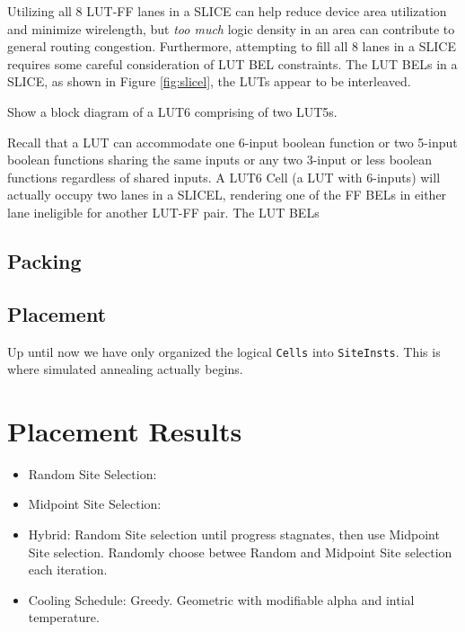 \documentclass{article}
\begin{document}
\begin{multicols}{2}
        Utilizing all 8 LUT-FF lanes in a SLICE can help reduce device area utilization and minimize wirelength, but \emph{too much} logic density in an area can contribute to general routing congestion. 
        Furthermore, attempting to fill all 8 lanes in a SLICE requires some careful consideration of LUT BEL constraints. 
        The LUT BELs in a SLICE, as shown in Figure \ref{fig:slicel}, the LUTs appear to be interleaved. 


        Show a block diagram of a LUT6 comprising of two LUT5s.


        Recall that a LUT can accommodate one 6-input boolean function or two 5-input boolean functions sharing the same inputs or any two 3-input or less boolean functions regardless of shared inputs. 
        A LUT6 Cell (a LUT with 6-inputs) will actually occupy two lanes in a SLICEL, rendering one of the FF BELs in either lane ineligible for another LUT-FF pair. 
        The LUT BELs
        
    \subsection{Packing}
        \label{subsec:packing}

    \subsection{Placement}
        \label{subsec:placement}
        Up until now we have only organized the logical \texttt{Cells} into \texttt{SiteInsts}. 
        This is where simulated annealing actually begins. 



\section{Placement Results}
    \begin{itemize}
    \item Random Site Selection:
    \item Midpoint Site Selection:
    \item Hybrid: 
        Random Site selection until progress stagnates, then use Midpoint Site selection. 
        Randomly choose betwee Random and Midpoint Site selection each iteration. 
    \item Cooling Schedule: 
        Greedy. 
        Geometric with modifiable alpha and intial temperature. 
    \end{itemize}


\end{multicols}
\end{document}
